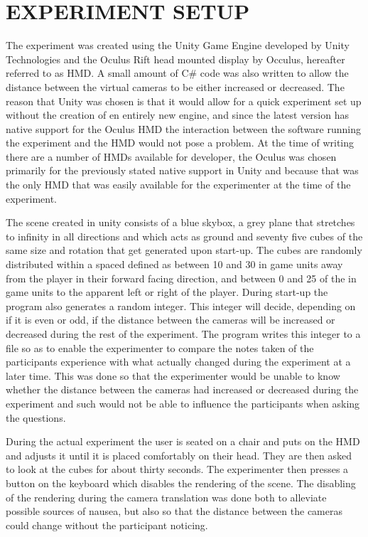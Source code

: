 \documentclass[tog]{acmsiggraph}
\begin{document}
\section{EXPERIMENT SETUP}

The experiment was created using the Unity Game Engine developed by Unity Technologies and the Oculus Rift head mounted display by Occulus, hereafter referred to as HMD. A small amount of C\# code was also written to allow the distance between the virtual cameras to be either increased or decreased. The reason that Unity was chosen is that it would allow for a quick experiment set up without the creation of en entirely new engine, and since the latest version has native support for the Oculus HMD the interaction between the software running the experiment and the HMD would not pose a problem.
At the time of writing there are a number of HMDs available for developer, the Oculus was chosen primarily for the previously stated native support in Unity and because that was the only HMD that was easily available for the experimenter at the time of the experiment.

The scene created in unity consists of a blue skybox, a grey plane that stretches to infinity in all directions and which acts as ground and seventy five cubes of the same size and rotation that get generated upon start-up. The cubes are randomly distributed within a spaced defined as between 10 and 30 in game units away from the player in their forward facing direction, and between 0 and 25 of the in game units to the apparent left or right of the player. During start-up the program also generates a random integer. This integer will decide, depending on if it is even or odd, if the distance between the cameras will be increased or decreased during the rest of the experiment. The program writes this integer to a file so as to enable the experimenter to compare the notes taken of the participants experience with what actually changed during the experiment at a later time. This was done so that the experimenter would be unable to know whether the distance between the cameras had increased or decreased during the experiment and such would not be able to influence the participants when asking the questions. 

During the actual experiment the user is seated on a chair and puts on the HMD and adjusts it until it is placed comfortably on their head. They are then asked to look at the cubes for about thirty seconds.
The experimenter then presses a button on the keyboard which disables the rendering of the scene. The disabling of the rendering during the camera translation was done both to alleviate possible sources of nausea, but also so that the distance between the cameras could change without the participant noticing. 
\end{document}
